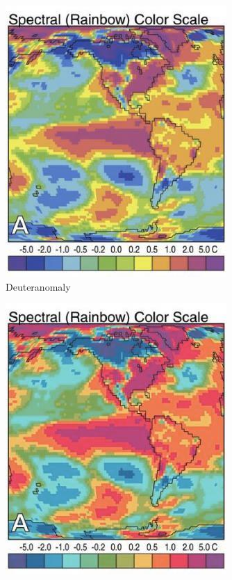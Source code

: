 \documentclass[11pt]{isuthesis}\usepackage[]{graphicx}\usepackage[]{color}
\begin{document}
\begin{figure}[!htbp]
\begin{minipage}[c]{.75\textwidth}
\begin{subfigure}[b]{.32\textwidth}
  \includegraphics[width=\textwidth]{RainbowScaleOrig-deuteranomaly}
  \caption{Deuteranomaly}
\end{subfigure}\hfil
\begin{subfigure}[b]{.32\textwidth}\centering
  \includegraphics[width=\textwidth]{RainbowScaleOrig-tritanomaly}

\end{subfigure}
\end{minipage}
\end{figure}
\end{document}
